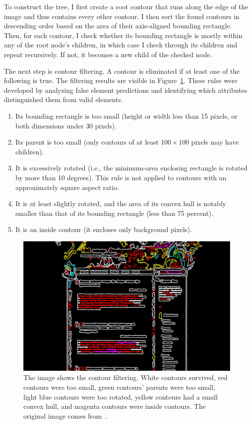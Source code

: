\documentclass[
  digital,     %
  oneside,     %
  nosansbold,  %
  nocolorbold, %
  lof,         %
  lot,         %
]{fithesis4}
\begin{document}
To construct the tree, I first create a root contour that runs along the edge of the image and thus contains every other contour. I then sort the found contours in descending order based on the area of their axis-aligned bounding rectangle. Then, for each contour, I check whether its bounding rectangle is mostly within any of the root node's children, in which case I check through its children and repeat recursively. If not, it becomes a new child of the checked node.

The next step is contour filtering. A contour is eliminated if at least one of the following is true. The filtering results are visible in Figure~\ref{fig:filtering}. These rules were developed by analyzing false element predictions and identifying which attributes distinguished them from valid elements.

\begin{enumerate}
    \item Its bounding rectangle is too small (height or width less than 15 pixels, or both dimensions under 30 pixels).
    \item Its parent is too small (only contours of at least $100 \times 100$ pixels may have children).
    \item It is excessively rotated (i.e., the minimum-area enclosing rectangle is rotated by more than 10 degrees). This rule is not applied to contours with an approximately square aspect ratio.
    \item It is at least slightly rotated, and the area of its convex hull is notably smaller than that of its bounding rectangle (less than 75 percent).
    \item It is an inside contour (it encloses only background pixels).
\end{enumerate}

\begin{figure}
    \centering
    \includegraphics[width=1\linewidth]{diagrams/filter.jpg}
    \caption{The image shows the contour filtering. White contours survived, red contours were too small, green contours' parents were too small, light blue contours were too rotated, yellow contours had a small convex hull, and magenta contours were inside contours. The original image comes from~\cite{aydos2020}.}
    \label{fig:filtering}
\end{figure}
\end{document}
